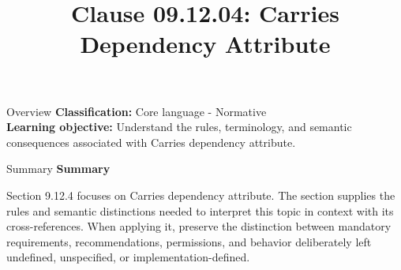 \documentclass[10pt,letterpaper]{article}
\title{Clause 09.12.04: Carries Dependency Attribute}
\author{}
\date{}
\begin{document}
\maketitle
\begin{CornellOverviewBox}{Overview}
\textbf{Classification:} Core language - Normative\\[2pt]
\textbf{Learning objective:} Understand the rules, terminology, and semantic consequences associated with Carries dependency attribute.
\end{CornellOverviewBox}\begin{CornellSummaryBox}{Summary}
{\sffamily\bfseries\color{Accent} Summary}\par\vspace{3pt}Section 9.12.4 focuses on Carries dependency attribute. The section supplies the rules and semantic distinctions needed to interpret this topic in context with its cross-references. When applying it, preserve the distinction between mandatory requirements, recommendations, permissions, and behavior deliberately left undefined, unspecified, or implementation-defined.
\end{CornellSummaryBox}
\end{document}
